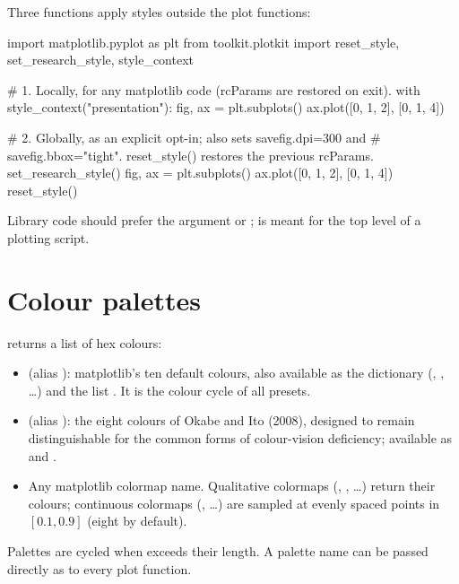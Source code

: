 Three functions apply styles outside the plot functions:

\begin{pycode}
import matplotlib.pyplot as plt
from toolkit.plotkit import reset_style, set_research_style, style_context

# 1. Locally, for any matplotlib code (rcParams are restored on exit).
with style_context("presentation"):
    fig, ax = plt.subplots()
    ax.plot([0, 1, 2], [0, 1, 4])

# 2. Globally, as an explicit opt-in; also sets savefig.dpi=300 and
#    savefig.bbox="tight". reset_style() restores the previous rcParams.
set_research_style()
fig, ax = plt.subplots()
ax.plot([0, 1, 2], [0, 1, 4])
reset_style()
\end{pycode}

Library code should prefer the  argument or
;  is meant for the top level
of a plotting script.

\section{Colour palettes}\label{sec:plotkit-palettes}

 returns a list of hex colours:

\begin{itemize}
  \item {} (alias ): matplotlib's ten default
    colours, also available as the dictionary 
    (, , \ldots) and the list
    . It is the colour cycle of all presets.
  \item {} (alias ): the eight colours of
    Okabe and Ito (2008), designed to remain distinguishable for the common
    forms of colour-vision deficiency; available as 
    and .
  \item Any matplotlib colormap name. Qualitative colormaps (,
    , \ldots) return their colours; continuous colormaps
    (, \ldots) are sampled at  evenly spaced points in
    $[0.1, 0.9]$ (eight by default).
\end{itemize}
Palettes are cycled when  exceeds their length. A palette name can be
passed directly as  to every plot function.

